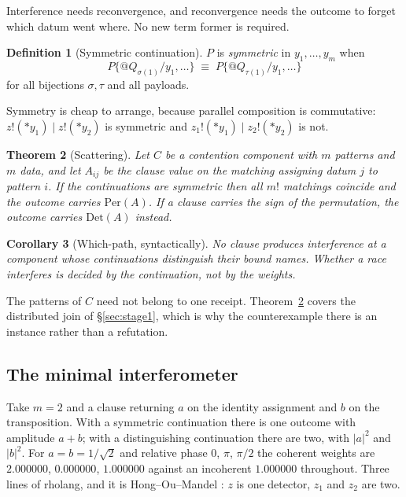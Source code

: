 \documentclass[11pt,a4paper]{article}
\theoremstyle{plain}
\newtheorem{theorem}{Theorem}[section]
\newtheorem{corollary}[theorem]{Corollary}
\theoremstyle{definition}
\newtheorem{definition}[theorem]{Definition}
\theoremstyle{remark}
\newcommand{\Per}{\mathrm{Per}}
\newcommand{\Det}{\mathrm{Det}}
\newcommand{\scong}{\equiv}
\begin{document}
Interference needs reconvergence, and reconvergence needs the outcome to forget
which datum went where. No new term former is required.

\begin{definition}[Symmetric continuation]\label{def:sym}
$P$ is \emph{symmetric} in $y_1,\dots,y_m$ when
\[
  P\{@Q_{\sigma(1)}/y_1,\dots\} \;\scong\; P\{@Q_{\tau(1)}/y_1,\dots\}
\]
for all bijections $\sigma,\tau$ and all payloads.
\end{definition}

Symmetry is cheap to arrange, because parallel composition is commutative:
$z!(*y_1) \mid z!(*y_2)$ is symmetric and $z_1!(*y_1) \mid z_2!(*y_2)$ is not.

\begin{theorem}[Scattering]\label{thm:scattering}
Let $C$ be a contention component with $m$ patterns and $m$ data, and let
$A_{ij}$ be the clause value on the matching assigning datum $j$ to pattern $i$.
If the continuations are symmetric then all $m!$ matchings coincide and the
outcome carries $\Per(A)$. If a clause carries the sign of the permutation, the
outcome carries $\Det(A)$ instead.
\end{theorem}

\begin{corollary}[Which-path, syntactically]\label{cor:whichpath}
No clause produces interference at a component whose continuations distinguish
their bound names. Whether a race interferes is decided by the continuation, not
by the weights.
\end{corollary}

The patterns of $C$ need not belong to one receipt. Theorem~\ref{thm:scattering}
covers the distributed join of \S\ref{sec:stage1}, which is why the
counterexample there is an instance rather than a refutation.

\subsection{The minimal interferometer}\label{ssec:interferometer}

Take $m = 2$ and a clause returning $a$ on the identity assignment and $b$ on
the transposition. With a symmetric continuation there is one outcome with
amplitude $a+b$; with a distinguishing continuation there are two, with
$|a|^2$ and $|b|^2$. For $a = b = 1/\sqrt2$ and relative phase $0$, $\pi$,
$\pi/2$ the coherent weights are $2.000000$, $0.000000$, $1.000000$ against an
incoherent $1.000000$ throughout. Three lines of rholang, and it is
Hong--Ou--Mandel \cite{HOM}: $z$ is one detector, $z_1$ and $z_2$ are two.
\end{document}

